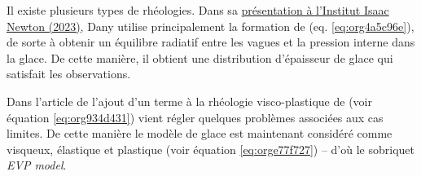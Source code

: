 \documentclass[10pt]{article}
\numberwithin{equation}{section}
\begin{document}
Il existe plusieurs types de rhéologies.
Dans sa \href{https://www.youtube.com/watch?v=\_V7ozTp6SJM}{présentation à l'Institut Isaac Newton (2023)}, Dany utilise principalement la formation de \Textcite{hibler1979dynamic} (eq. \ref{eq:org4a5c96e}), de sorte à obtenir un équilibre radiatif entre les vagues et la pression interne dans la glace.
De cette manière, il obtient une distribution d'épaisseur de glace qui satisfait les observations.\medskip

Dans l'article de \Textcite{hunke1997elastic}  l'ajout d'un terme à la rhéologie visco-plastique de \Textcite{hibler1979dynamic} (voir équation \ref{eq:org934d431}) vient régler quelques problèmes associées aux cas limites.
De cette manière le modèle de glace est maintenant considéré comme visqueux, élastique et plastique (voir équation \ref{eq:orge77f727}) -- d'où le sobriquet \emph{EVP model}.



\printbibliography
\end{document}
